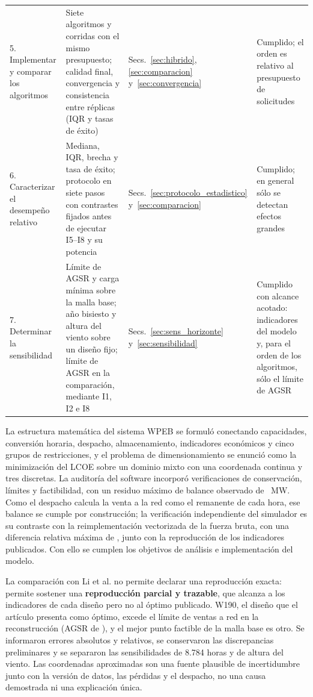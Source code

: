 \begin{table}[H]
\begin{tabular}{@{}p{2.6cm} p{6.1cm} p{2.2cm} p{2.7cm}@{}}
\raggedright 5. Implementar y comparar los algoritmos & \raggedright Siete algoritmos y \TotalRuns{} corridas con el mismo presupuesto; calidad final, convergencia y consistencia entre réplicas (IQR y tasas de éxito) & \raggedright Secs.~\ref{sec:hibrido}, \ref{sec:comparacion} y~\ref{sec:convergencia} & \raggedright Cumplido; el orden es relativo al presupuesto de \RequestsPerRun{} solicitudes \tabularnewline
\raggedright 6. Caracterizar el desempeño relativo & \raggedright Mediana, IQR, brecha y tasa de éxito; protocolo en siete pasos con \StatTestsTotal{} contrastes fijados antes de ejecutar I5--I8 y su potencia & \raggedright Secs.~\ref{sec:protocolo_estadistico} y~\ref{sec:comparacion} & \raggedright Cumplido; en general sólo se detectan efectos grandes \tabularnewline
\raggedright 7. Determinar la sensibilidad & \raggedright Límite de AGSR y carga mínima sobre la malla base; año bisiesto y altura del viento sobre un diseño fijo; límite de AGSR en la comparación, mediante I1, I2 e I8 & \raggedright Secs.~\ref{sec:sens_horizonte} y~\ref{sec:sensibilidad} & \raggedright Cumplido con alcance acotado: indicadores del modelo y, para el orden de los algoritmos, sólo el límite de AGSR \tabularnewline
\hline
\end{tabular}
\end{table}

La estructura matemática del sistema WPEB se formuló conectando capacidades, conversión horaria, despacho, almacenamiento, indicadores económicos y cinco grupos de restricciones, y el problema de dimensionamiento se enunció como la minimización del LCOE sobre un dominio mixto con una coordenada continua y tres discretas. La auditoría del software incorporó verificaciones de conservación, límites y factibilidad, con un residuo máximo de balance observado de \MaxBalanceResidual~MW. Como el despacho calcula la venta a la red como el remanente de cada hora, ese balance se cumple por construcción; la verificación independiente del simulador es su contraste con la reimplementación vectorizada de la fuerza bruta, con una diferencia relativa máxima de \MaxControlRelDiff, junto con la reproducción de los indicadores publicados. Con ello se cumplen los objetivos de análisis e implementación del modelo.

La comparación con Li et al. \cite{Li2024WPEB} no permite declarar una reproducción exacta: permite sostener una \textbf{reproducción parcial y trazable}, que alcanza a los indicadores de cada diseño pero no al óptimo publicado. W190, el diseño que el artículo presenta como óptimo, excede el límite de ventas a red en la reconstrucción (AGSR de \ReproOptimumAGSR), y el mejor punto factible de la malla base es otro. Se informaron errores absolutos y relativos, se conservaron las discrepancias preliminares y se separaron las sensibilidades de 8.784 horas y de altura del viento. Las coordenadas aproximadas son una fuente plausible de incertidumbre junto con la versión de datos, las pérdidas y el despacho, no una causa demostrada ni una explicación única.

